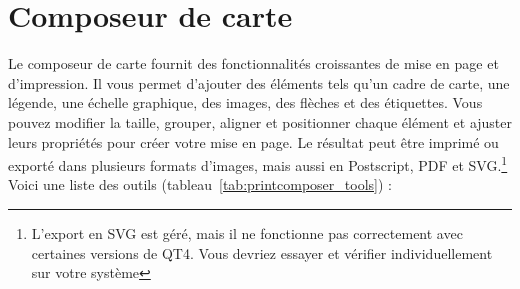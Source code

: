 \chapter{Composeur de carte}\label{label_printcomposer}


Le composeur de carte fournit des fonctionnalités croissantes de mise en page et d'impression. Il vous permet d'ajouter des éléments tels qu'un cadre de carte, une légende, une échelle graphique, des images, des flèches et des étiquettes. Vous pouvez modifier la taille, grouper, aligner et positionner chaque élément et ajuster leurs propriétés pour créer votre mise en page. Le résultat peut être imprimé ou exporté dans plusieurs formats d'images, mais aussi en Postscript, PDF et SVG.\footnote{L'export en SVG est géré, mais il ne fonctionne pas correctement avec certaines versions de QT4. Vous devriez essayer et vérifier individuellement sur votre système} Voici une liste des outils (tableau~\ref{tab:printcomposer_tools}) :

